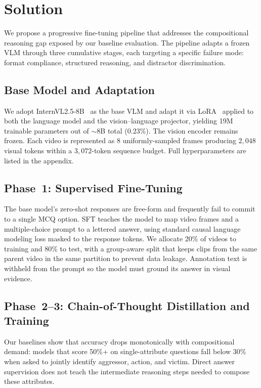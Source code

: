 \section{Solution}

We propose a progressive fine-tuning pipeline that addresses the
compositional reasoning gap exposed by our baseline evaluation.
The pipeline adapts a frozen VLM through three cumulative stages, each
targeting a specific failure mode: format compliance, structured reasoning,
and distractor discrimination.

\subsection{Base Model and Adaptation}

We adopt InternVL2.5-8B~\cite{chen2024internvl25} as the base VLM and
adapt it via LoRA~\cite{hu2022lora} applied to both the language model and
the vision--language projector, yielding 19M trainable parameters out of
${\sim}8$B total (0.23\%).
The vision encoder remains frozen.
Each video is represented as 8 uniformly-sampled frames producing
$2{,}048$ visual tokens within a $3{,}072$-token sequence budget.
Full hyperparameters are listed in the appendix.

\subsection{Phase~1: Supervised Fine-Tuning}
\label{sec:sft}

The base model's zero-shot responses are free-form and frequently fail to
commit to a single MCQ option.
SFT teaches the model to map video frames and a multiple-choice prompt to a
lettered answer, using standard causal language modeling loss masked to the
response tokens.
We allocate 20\% of videos to training and 80\% to test, with a
group-aware split that keeps clips from the same parent video in the same
partition to prevent data leakage.
Annotation text is withheld from the prompt so the model must ground its
answer in visual evidence.

\subsection{Phase~2--3: Chain-of-Thought Distillation and Training}
\label{sec:cot}

Our baselines show that accuracy drops monotonically with compositional
demand: models that score 50\%+ on single-attribute questions fall below
30\% when asked to jointly identify aggressor, action, and victim.
Direct answer supervision does not teach the intermediate reasoning steps
needed to compose these attributes.


